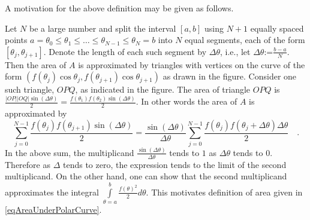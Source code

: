 \documentclass[12pt]{book}
\newcommand{\eqdef}{\textbf{:=}}
\newcommand{\optionalDisplay}[1]{}
\begin{document}
A motivation for the above definition may be given as follows. 

\optionalDisplay{
\begin{pspicture*}(-4,-1)(7.3,5.4)
\newcommand{\dThetA}{20}
\rput(4,5){$r=f(\theta)$}
\psaxes[labels=none]{<->}(0,0)(-3.5,-0.5)(4.5,5.2)
\multido{\rb=10+\dThetA}{6}{%
\pstVerb{/rR \rb\space 30 div 2 add def
/rRPlusTheta \rb\space \dThetA\space add 30 div 2 add def
}
\pscustom[fillcolor=blue!30, fillstyle=solid, linecolor=blue]{\psline(0,0)(! rR \rb \space cos mul rR \rb \space sin mul) (! rRPlusTheta \rb \space\dThetA\space add cos mul rRPlusTheta \rb \space \dThetA\space add sin mul) }
}
\parametricplot[linecolor=red, plotpoints=500]{10}{130}
{ t 30 div 2 add  t cos mul
  t 30 div 2 add  t sin mul} 
\parametricplot[linecolor=red]{30}{50} %
{t cos 1 mul
 t sin 1 mul } 
\rput[lt](0.8, 0.8){\tiny$\Delta\theta$}
\parametricplot[linecolor=red, arrows=->]{0}{30} %
{t cos 0.5 mul
 t sin 0.5 mul } 
\rput[lt](0.55,0.3){\tiny$\theta_1$}
\parametricplot[linecolor=red, arrows=->]{0}{50} %
{t cos 0.85 mul
 t sin 0.85 mul } 
\rput[lt](0.85,0.4){\tiny$\theta_2$}

\rput[tr] (-0.1,-0.1){$O$}
\rput[tl] (2.7,1.5){$P=(f(\theta_1)\cos \theta_1, f(\theta_1)\sin \theta_1)$}
\rput[tl] (2.51,2.95){$Q=(f(\theta_2)\cos \theta_2, f(\theta_2)\sin \theta_2)$}
\end{pspicture*}
} %

Let $N$ be a large number and split the interval $[a,b]$ using $N+1$ equally spaced points $a=\theta_0\leq\theta_1\leq\dots\leq\theta_{N-1}\leq \theta_N=b$ into $N$ equal segments, each of the form $[\theta_j,\theta_{j+1}] $. Denote the length of each such segment by $\Delta\theta$, i.e., let $\Delta\theta\eqdef \frac{b-a}{N}$. Then the area of $A$ is approximated by triangles with vertices on the curve of the form $(f(\theta_j)\cos \theta_j, f(\theta_{j+1} )\cos \theta_{j+1})$ as drawn in the figure. Consider one such triangle, $OPQ$, as indicated in the figure. The area of triangle $OPQ $ is $\frac{|OP| |OQ|\sin (\Delta\theta)}{2}= \frac{f(\theta_1)f(\theta_2)\sin (\Delta\theta)}{2} $. In other words the area of $A$ is approximated by
\[
\sum_{j=0}^{N-1} \frac{f(\theta_j)f(\theta_{j+1})\sin (\Delta\theta)}{2}= \frac{\sin(\Delta\theta)}{\Delta\theta}\sum_{j=0}^{N-1} \frac{f(\theta_j)f(\theta_{j}+\Delta\theta)\Delta\theta}{2}\quad .
\]
In the above sum, the multiplicand $\frac{\sin(\Delta\theta)}{\Delta\theta}$ tends to $1$ as $\Delta\theta$ tends to $0$. Therefore as $\Delta$ tends to zero, the expression tends to the limit of the second multiplicand. On the other hand, one can show that the second multiplicand approximates the integral $\int\limits_{\theta=a}^b \frac{f(\theta)^2}{2}d\theta$. This motivates definition of area given in \eqref{eqAreaUnderPolarCurve}.
\end{document}

